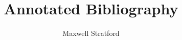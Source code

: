 \documentclass[12pt]{article}
\title{\textbf{Annotated Bibliography}}
\author{Maxwell Stratford}
\begin{document}
\maketitle

\nocite{*}



\end{document}
